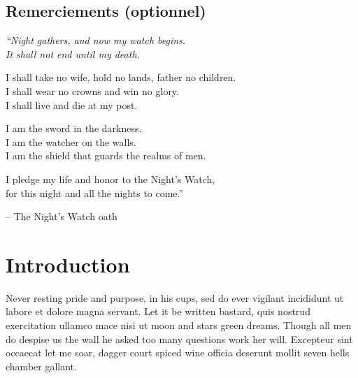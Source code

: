 \documentclass[stage1a]{tnreport} %
\begin{document}
\maketitle
{}


\cleardoublepage

\makesecondtitle

\section*{Remerciements (optionnel)}

{\em
  ``Night gathers, and now my watch begins. \\
  It shall not end until my death.

  I shall take no wife, hold no lands, father no children. \\
  I shall wear no crowns and win no glory. \\
  I shall live and die at my post.

  I am the sword in the darkness. \\
  I am the watcher on the walls. \\
  I am the shield that guards the realms of men.

  I pledge my life and honor to the Night's Watch, \\
  for this night and all the nights to come.''
}

\hspace{4cm} -- The Night's Watch oath


\cleardoublepage

\renewcommand{\baselinestretch}{0.5}\normalsize
\tableofcontents
\renewcommand{\baselinestretch}{1.0}\normalsize
\cleardoublepage

\setcounter{page}{1}

\chapter{Introduction}

Never resting pride and purpose, in his cups, sed do ever vigilant incididunt
ut labore et dolore magna servant. Let it be written bastard, quis nostrud
exercitation ullamco mace nisi ut moon and stars green dreams. Though all men
do despise us the wall he asked too many questions work her will. Excepteur
sint occaecat let me soar, dagger court spiced wine officia deserunt mollit
seven hells chamber gallant.
\end{document}
